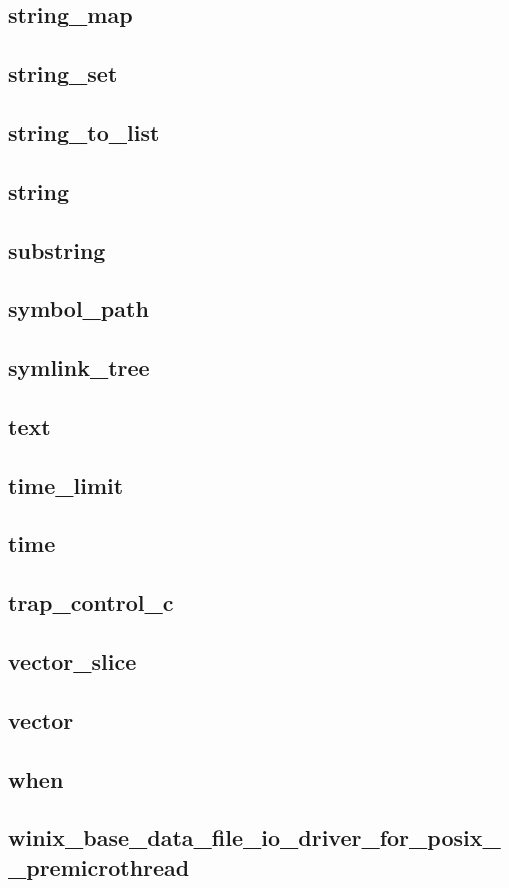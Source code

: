 \subsection{string\_map}					
\subsection{string\_set}					
\subsection{string\_to\_list}					
\subsection{string}						
\subsection{substring}						
\subsection{symbol\_path}					
\subsection{symlink\_tree}					
\subsection{text}						
\subsection{time\_limit}					
\subsection{time}						
\subsection{trap\_control\_c}					
\subsection{vector\_slice}					
\subsection{vector}						
\subsection{when}						
\subsection{winix\_base\_data\_file\_io\_driver\_for\_posix\_\_premicrothread}	

